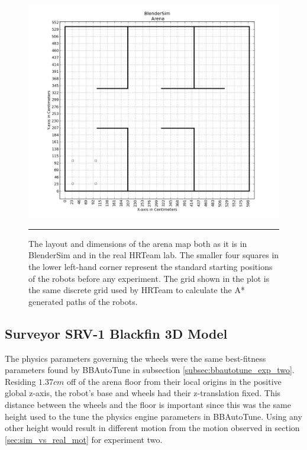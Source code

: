 \begin{figure}[htbp]
\centering
\includegraphics[width=6in]{../Figures/Chapter5/arena.png}
\rule{35em}{0.5pt}
\caption[BlenderSim Arena]{The layout and dimensions of the arena map both as it is in BlenderSim and in the real HRTeam lab. The smaller four squares in the lower left-hand corner represent the standard starting positions of the robots before any experiment. The grid shown in the plot is the same discrete grid used by HRTeam to calculate the A* generated paths of the robots. }
\label{fig:arena_map}
\end{figure}

\subsection{Surveyor SRV-1 Blackfin 3D Model}

The physics parameters governing the wheels were the same best-fitness parameters found by BBAutoTune in subsection \ref{subsec:bbautotune_exp_two}. Residing $1.37cm$ off of the arena floor from their local origins in the positive global z-axis, the robot's base and wheels had their z-translation fixed. This distance between the wheels and the floor is important since this was the same height used to the tune the physics engine parameters in BBAutoTune. Using any other height would result in different motion from the motion observed in section \ref{sec:sim_vs_real_mot} for experiment two.   

